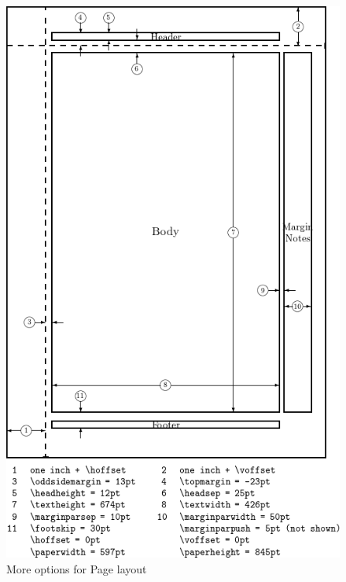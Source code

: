 \clearpage


\appendix
\begin{figure}[h]
  \centering
  \includegraphics[height=0.9\textheight]{layout.png}
  \caption{More options for Page layout}\label{pageLayoutFig}
\end{figure}

%

